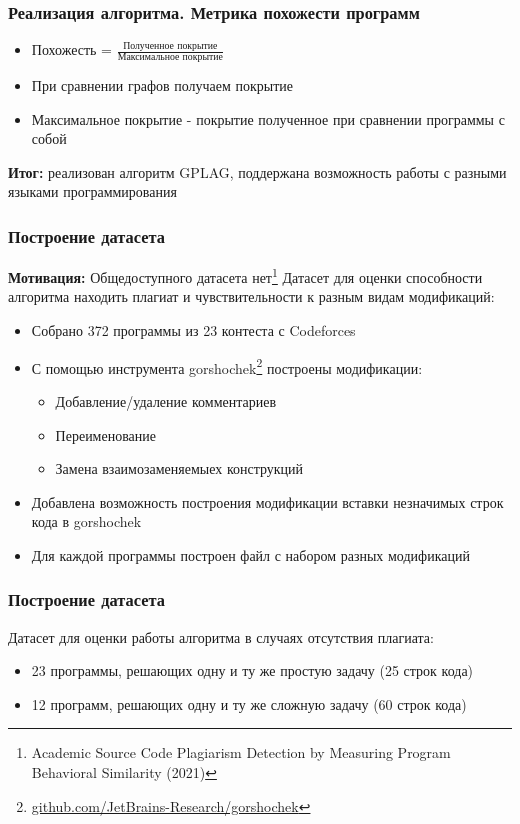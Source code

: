 \documentclass[10pt]{beamer}
\begin{document}
\begin{frame}\frametitle{Реализация алгоритма. Метрика похожести программ}
	\begin{itemize}
		\item Похожесть = $\frac{\text{Полученное покрытие}}{\text{Максимальное покрытие}}$
		\item При сравнении графов получаем покрытие
		\item Максимальное покрытие - покрытие полученное при сравнении программы с собой
	\end{itemize}
    \vspace{1cm}
    \textbf{Итог:} реализован алгоритм GPLAG, поддержана возможность работы с разными языками программирования
	
\end{frame}

\begin{frame}\frametitle{Построение датасета}
	\textbf{Мотивация:} Общедоступного датасета нет\footnote[8,frame]{Academic Source Code Plagiarism Detection by Measuring Program Behavioral Similarity (2021)}
	\newline
	\newline
	Датасет для оценки способности алгоритма находить плагиат и чувствительности к разным видам модификаций:
	\begin{itemize}
		\item Собрано 372 программы из 23 контеста с Codeforces
		\item С помощью инструмента gorshochek\footnote[9,frame]{\href{https://github.com/JetBrains-Research/gorshochek}{\color{blue}github.com/JetBrains-Research/gorshochek}} построены модификации:
		\begin{itemize} 
			\item Добавление/удаление комментариев
			\item Переименование
			\item Замена взаимозаменяемыех конструкций
		\end{itemize}
		\item Добавлена возможность построения модификации вставки незначимых строк кода в gorshochek
		\item Для каждой программы построен файл с набором разных модификаций
	\end{itemize}
	
\end{frame}

\begin{frame}\frametitle{Построение датасета}
	Датасет для оценки работы алгоритма в случаях отсутствия плагиата:
	\begin{itemize}
		\item 23 программы, решающих одну и ту же простую задачу (25 строк кода)
		\item 12 программ, решающих одну и ту же сложную задачу (60 строк кода)
	\end{itemize}
	
\end{frame}
\end{document}
